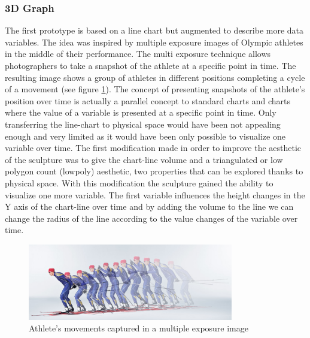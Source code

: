 \documentclass[../medieninformatik-arbeit.tex]{subfiles}
\begin{document}
\subsubsection{3D Graph}
The first prototype is based on a line chart but augmented to describe more data variables. The idea was inspired by multiple exposure images of Olympic athletes in the middle of their performance. The multi exposure technique allows photographers to take a snapshot of the athlete at a specific point in time. The resulting image shows a group of athletes in different positions completing a cycle of a movement (see figure \ref{fig:multiexposure}). The concept of presenting snapshots of the athlete's position over time is actually a parallel concept to standard charts and charts where the value of a variable is presented at a specific point in time. Only transferring the line-chart to physical space would have been not appealing enough and very limited as it would have been only possible to visualize one variable over time. The first modification made in order to improve the aesthetic of the sculpture was to give the chart-line volume and a triangulated or low polygon count (lowpoly) aesthetic, two properties that can be explored thanks to physical space. With this modification the sculpture gained the ability to visualize one more variable. The first variable influences the height changes in the Y axis of the chart-line over time and by adding the volume to the line we can change the radius of the line according to the value changes of the variable over time. 

\begin{figure}[ht]
\captionsetup{width=0.8\textwidth}
\begin{center}
  \includegraphics[width=0.8\textwidth]{Prototype/img/multiexposure}
  \caption{Athlete's movements captured in a multiple exposure image \cite{multiexposure}}
\label{fig:multiexposure}
\end{center}
\end{figure}
\end{document}
